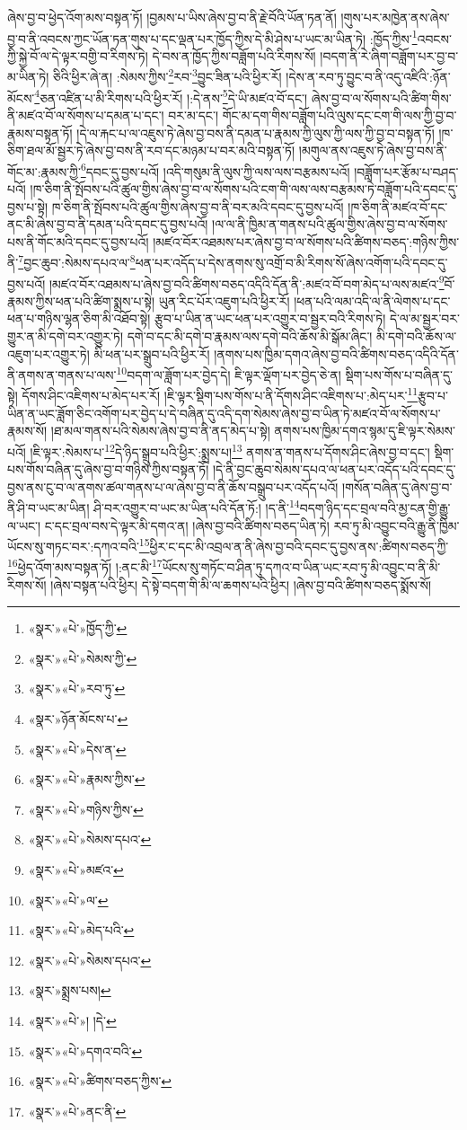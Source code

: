 ཞེས་བྱ་བ་ཕྱེད་འོག་མས་བསྟན་ཏོ། །བྱམས་པ་ཡིས་ཞེས་བྱ་བ་ནི་རྗེ་བོའི་ཡོན་ཏན་ནོ། །གུས་པར་མཁྱེན་ནས་ཞེས་བྱ་བ་ནི་འབངས་ཀྱང་ཡོན་ཏན་གུས་པ་དང་ལྡན་པར་ཁྱོད་ཀྱིས་དེ་མི་ཤེས་པ་ཡང་མ་ཡིན་ཏེ། :ཁྱོད་ཀྱིས་\footnote{«སྣར་»«པེ་»ཁྱོད་ཀྱི་}འབངས་ཀྱི་སྐྱེ་བོ་ལ་དེ་ལྟར་བགྱི་བ་རིགས་ཏེ། དེ་བས་ན་ཁྱོད་ཀྱིས་བཟློག་པའི་རིགས་སོ། །བདག་ནི་རེ་ཞིག་བཟློག་པར་བྱ་བ་མ་ཡིན་ཏེ། ཅིའི་ཕྱིར་ཞེ་ན། :སེམས་ཀྱིས་\footnote{«སྣར་»«པེ་»སེམས་ཀྱི་}རབ་\footnote{«སྣར་»«པེ་»རབ་ཏུ་}བྱུང་ཟིན་པའི་ཕྱིར་རོ། །དེས་ན་རབ་ཏུ་བྱུང་བ་ནི་འདུ་འཛིའི་:ཉོན་མོངས་\footnote{«སྣར་»ཉོན་མོངས་པ་}ཅན་འཛིན་པ་མི་རིགས་པའི་ཕྱིར་རོ། །:དེ་ནས་\footnote{«སྣར་»«པེ་»དེས་ན་}དེ་ཡི་མཛའ་བོ་དང་། ཞེས་བྱ་བ་ལ་སོགས་པའི་ཚིག་གིས་ནི་མཛའ་བོ་ལ་སོགས་པ་དམན་པ་དང་། བར་མ་དང་། གོང་མ་དག་གིས་བཟློག་པའི་ལུས་དང་ངག་གི་ལས་ཀྱི་བྱ་བ་རྣམས་བསྟན་ཏོ། །དེ་ལ་རྐང་པ་ལ་འཇུས་ཏེ་ཞེས་བྱ་བས་ནི་དམན་པ་རྣམས་ཀྱི་ལུས་ཀྱི་ལས་ཀྱི་བྱ་བ་བསྟན་ཏོ། །ཁ་ཅིག་ཐལ་མོ་སྦྱར་ཏེ་ཞེས་བྱ་བས་ནི་རབ་དང་མཉམ་པ་བར་མའི་བསྟན་ཏོ། །མགུལ་ནས་འཇུས་ཏེ་ཞེས་བྱ་བས་ནི་གོང་མ་:རྣམས་ཀྱི་\footnote{«སྣར་»«པེ་»རྣམས་ཀྱིས་}དབང་དུ་བྱས་པའོ། །འདི་གསུམ་ནི་ལུས་ཀྱི་ལས་ལས་བརྩམས་པའོ། །བཟློག་པར་རྩོམ་པ་བཤད་པའོ། །ཁ་ཅིག་ནི་སྤོབས་པའི་ཚུལ་གྱིས་ཞེས་བྱ་བ་ལ་སོགས་པའི་ངག་གི་ལས་ལས་བརྩམས་ཏེ་བཟློག་པའི་དབང་དུ་བྱས་པ་སྟེ། ཁ་ཅིག་ནི་སྤོབས་པའི་ཚུལ་གྱིས་ཞེས་བྱ་བ་ནི་བར་མའི་དབང་དུ་བྱས་པའོ། །ཁ་ཅིག་ནི་མཛའ་བོ་དང་ནང་མི་ཞེས་བྱ་བ་ནི་དམན་པའི་དབང་དུ་བྱས་པའོ། །ལ་ལ་ནི་ཁྱིམ་ན་གནས་པའི་ཚུལ་གྱིས་ཞེས་བྱ་བ་ལ་སོགས་པས་ནི་གོང་མའི་དབང་དུ་བྱས་པའོ། །མཛའ་བོར་འཐམས་པར་ཞེས་བྱ་བ་ལ་སོགས་པའི་ཚིགས་བཅད་:གཉིས་ཀྱིས་ནི་\footnote{«སྣར་»«པེ་»གཉིས་ཀྱིས་}བྱང་ཆུབ་:སེམས་དཔའ་ལ་\footnote{«སྣར་»«པེ་»སེམས་དཔའ་}ཕན་པར་འདོད་པ་དེས་ནགས་སུ་འགྲོ་བ་མི་རིགས་སོ་ཞེས་འགོག་པའི་དབང་དུ་བྱས་པའོ། །མཛའ་བོར་འཐམས་པ་ཞེས་བྱ་བའི་ཚིགས་བཅད་འདིའི་དོན་ནི་:མཛའ་བོ་བག་མེད་པ་ལས་མཛའ་\footnote{«སྣར་»«པེ་»མཛའ་}བོ་རྣམས་ཀྱིས་ཕན་པའི་ཚིག་སྨྲས་པ་སྟེ། ཡུན་རིང་པོར་འཇུག་པའི་ཕྱིར་རོ། །ཕན་པའི་ལམ་འདི་ལ་ནི་ལེགས་པ་དང་ཕན་པ་གཉིས་ལྷན་ཅིག་མི་འཐོབ་སྟེ། རྩུབ་པ་ཡིན་ན་ཡང་ཕན་པར་འགྱུར་བ་སྦྱར་བའི་རིགས་ཏེ། དེ་ལ་མ་སྦྱར་བར་གྱུར་ན་མི་དགེ་བར་འགྱུར་ཏེ། དགེ་བ་དང་མི་དགེ་བ་རྣམས་ལས་དགེ་བའི་ཆོས་མི་སྒོམ་ཞིང་། མི་དགེ་བའི་ཆོས་ལ་འཇུག་པར་འགྱུར་ཏེ། མི་ཕན་པར་སྒྲུབ་པའི་ཕྱིར་རོ། །ནགས་པས་ཁྱིམ་དགའ་ཞེས་བྱ་བའི་ཚིགས་བཅད་འདིའི་དོན་ནི་ནགས་ན་གནས་པ་ལས་\footnote{«སྣར་»«པེ་»ལ་}བདག་ལ་ཟློག་པར་བྱེད་དེ། ཇི་ལྟར་ལྡོག་པར་བྱེད་ཅེ་ན། སྡིག་པས་གོས་པ་བཞིན་དུ་སྟེ། དོགས་ཤིང་འཇིགས་པ་མེད་པར་རོ། །ཇི་ལྟར་སྡིག་པས་གོས་པ་ནི་དོགས་ཤིང་འཇིགས་པ་:མེད་པར་\footnote{«སྣར་»«པེ་»མེད་པའི་}རྩུབ་པ་ཡིན་ན་ཡང་ཟློག་ཅིང་འགོག་པར་བྱེད་པ་དེ་བཞིན་དུ་འདི་དག་སེམས་ཞེས་བྱ་བ་ཡིན་ཏེ་མཛའ་བོ་ལ་སོགས་པ་རྣམས་སོ། །ཐ་མལ་གནས་པའི་སེམས་ཞེས་བྱ་བ་ནི་ནད་མེད་པ་སྟེ། ནགས་པས་ཁྱིམ་དགའ་སྙམ་དུ་ཇི་ལྟར་སེམས་པའོ། །ཇི་ལྟར་:སེམས་པ་\footnote{«སྣར་»«པེ་»སེམས་དཔའ་}དེ་ཉིད་སྒྲུབ་པའི་ཕྱིར་:སྨྲས་པ།\footnote{«སྣར་»སྨྲས་པས།} ནགས་ན་གནས་པ་དོགས་ཤིང་ཞེས་བྱ་བ་དང་། སྡིག་པས་གོས་བཞིན་དུ་ཞེས་བྱ་བ་གཉིས་ཀྱིས་བསྟན་ཏོ། །དེ་ནི་བྱང་ཆུབ་སེམས་དཔའ་ལ་ཕན་པར་འདོད་པའི་དབང་དུ་བྱས་ནས་ངུ་བ་ལ་ནགས་ཚལ་གནས་པ་ལ་ཞེས་བྱ་བ་ནི་ཆོས་བསྒྲུབ་པར་འདོད་པའོ། །གསོན་བཞིན་དུ་ཞེས་བྱ་བ་ནི་ཤི་བ་ཡང་མ་ཡིན། ཤི་བར་འགྱུར་བ་ཡང་མ་ཡིན་པའི་དོན་ཏོ:། །ད་ནི་\footnote{«སྣར་»«པེ་»། །དེ་}བདག་ཉིད་དང་བྲལ་བའི་མྱ་ངན་གྱི་རྒྱུ་ལ་ཡང་། ང་དང་བྲལ་བས་དེ་ལྟར་མི་དགའ་ན། །ཞེས་བྱ་བའི་ཚིགས་བཅད་ཡིན་ཏེ། རབ་ཏུ་མི་འབྱུང་བའི་རྒྱུ་ནི་ཁྱིམ་ཡོངས་སུ་གཏང་བར་:དཀའ་བའི་\footnote{«སྣར་»«པེ་»དགའ་བའི་}ཕྱིར་ང་དང་མི་འབྲལ་ན་ནི་ཞེས་བྱ་བའི་དབང་དུ་བྱས་ནས་:ཚིགས་བཅད་ཀྱི་\footnote{«སྣར་»«པེ་»ཚིགས་བཅད་ཀྱིས་}ཕྱེད་འོག་མས་བསྟན་ཏོ། །:ནང་མི་\footnote{«སྣར་»«པེ་»ནང་ནི་}ཡོངས་སུ་གཏོང་བ་ཤིན་ཏུ་དཀའ་བ་ཡིན་ཡང་རབ་ཏུ་མི་འབྱུང་བ་ནི་མི་རིགས་སོ། །ཞེས་བསྟན་པའི་ཕྱིར། དེ་སྟེ་བདག་གི་མི་ལ་ཆགས་པའི་ཕྱིར། །ཞེས་བྱ་བའི་ཚིགས་བཅད་སྨོས་སོ། 